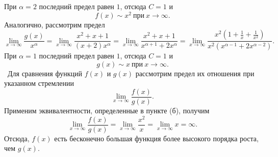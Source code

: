 При $\alpha=2$ последний предел равен $1$, отсюда $C=1$ и 
$$
f(x)\sim x^2~\text{при}~x\rightarrow\infty.
$$
Аналогично, рассмотрим предел
$$
\lim\limits_{x\rightarrow\infty}\dfrac{g(x)}{x^{\alpha}} = 
\lim\limits_{x\rightarrow\infty}\dfrac{x^2+x+1}{(x+2)x^{\alpha}} =
\lim\limits_{x\rightarrow\infty}\dfrac{x^2+x+1}{x^{\alpha+1}+2x^{\alpha}} =
\lim\limits_{x\rightarrow\infty}\dfrac{x^2(1+\frac1x+\frac{1}{x^2})}{x^2(x^{\alpha-1}+2x^{\alpha-2})}.
$$
При $\alpha=1$ последний предел равен $1$, отсюда $C=1$ и
$$
g(x)\sim x~\text{при}~x\rightarrow\infty.
$$
~Для сравнения функций $f(x)$ и $g(x)$ рассмотрим предел их отношения при указанном стремлении
$$
\lim\limits_{x\rightarrow\infty}\dfrac{f(x)}{g(x)}.
$$
Применим эквивалентности, определенные в пункте (б), получим
$$
\lim\limits_{x\rightarrow\infty}\dfrac{f(x)}{g(x)} = 
\lim\limits_{x\rightarrow\infty}\dfrac{x^2}{x} = 
\lim\limits_{x\rightarrow\infty} x = \infty.  
$$
Отсюда, $f(x)$ есть бесконечно большая функция более высокого порядка роста, чем $g(x)$.

